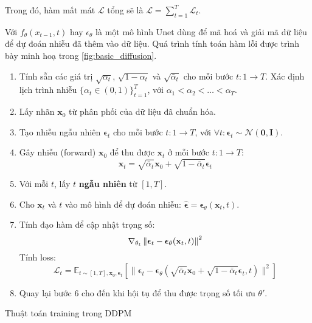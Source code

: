 Trong đó, hàm mất mát $\mathcal{L}$ tổng sẽ là  $\mathcal{L} = \sum_{t=1}^{T} \mathcal{L}_t$.

Với $f_{\theta}(x_{t-1}, t)$ hay $\epsilon_\theta$ là một mô hình Unet dùng để mã hoá và giải mã dữ liệu để dự đoán nhiễu đã thêm vào dữ liệu. Quá trình tính toán hàm lỗi được trình bày minh hoạ trong \autoref{fig:basic_diffusion}.


\begin{algorithm}[H]
	
	\setlength{\baselineskip}{10pt}
	\begin{enumerate}
		\vspace{5pt}
		\item Tính sẵn các giá trị $\sqrt{\alpha_t}$, $\sqrt{1 - \alpha_t}$ và $\sqrt{\bar{\alpha}_t}$ cho mỗi bước $t: 1 \rightarrow T$. Xác định lịch trình nhiễu $\{\alpha_t \in (0, 1)\}_{t=1}^T$, với $\alpha_1 < \alpha_2 < \dots < \alpha_T$.
		
		\item Lấy nhãn $\mathbf{x}_0$ từ phân phối của dữ liệu đã chuẩn hóa.
		
		\item Tạo nhiễu ngẫu nhiên $\boldsymbol{\epsilon}_t$ cho mỗi bước $t: 1 \rightarrow T$, với $\forall t: \boldsymbol{\epsilon}_t \sim \mathcal{N}(\mathbf{0}, \mathbf{I})$.
		
		\item Gây nhiễu (forward) $\mathbf{x}_0$ để thu được $\mathbf{x}_t$ ở mỗi bước $t: 1 \rightarrow T$:
		$$
		\mathbf{x}_t = \sqrt{\bar{\alpha}_t} \mathbf{x}_0 + \sqrt{1 - \bar{\alpha}_t} \boldsymbol{\epsilon}_t
		$$
		
		\item Với mỗi $t$, lấy $t$ \textbf{ngẫu nhiên} từ $[1, T]$.
		
		\item Cho $\mathbf{x}_t$ và $t$ vào mô hình để dự đoán nhiễu: $\hat{\boldsymbol{\epsilon}} = \boldsymbol{\epsilon}_\theta(\mathbf{x}_t, t)$.
		
		\item Tính đạo hàm để cập nhật trọng số:
		$$
		\nabla_{\theta_t} \left\| \boldsymbol{\epsilon}_t - \boldsymbol{\epsilon}_\theta(\mathbf{x}_t, t) \right\|^2
		$$
		Tính loss:
		$$
		\mathcal{L}_t = \mathbb{E}_{t \sim [1, T], \mathbf{x}_0, \boldsymbol{\epsilon}_t} \left[ \|\boldsymbol{\epsilon}_t - \boldsymbol{\epsilon}_\theta(\sqrt{\bar{\alpha}_t} \mathbf{x}_0 + \sqrt{1 - \bar{\alpha}_t} \boldsymbol{\epsilon}_t, t)\|^2 \right]
		$$
		
		\item Quay lại bước 6 cho đến khi hội tụ để thu được trọng số tối ưu $\theta'$.
	\end{enumerate}
	\caption{Thuật toán training trong DDPM}
	\label{alg:TrainingDDPM}
\end{algorithm}

